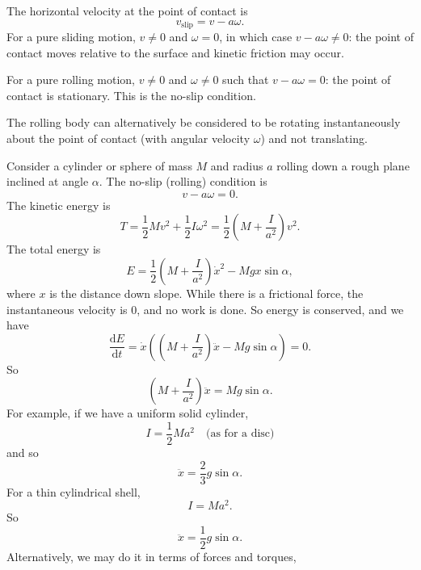 The horizontal velocity at the point of contact is
\[
  v_{\text{slip}} = v - a\omega.
\]
For a pure sliding motion, $v \not = 0$ and $\omega = 0$, in which case $v - a\omega \not = 0$: the point of contact moves relative to the surface and kinetic friction may occur.

For a pure rolling motion, $v\not = 0$ and $\omega \not = 0$ such that $v - a\omega = 0$: the point of contact is stationary. This is the no-slip condition.

The rolling body can alternatively be considered to be rotating instantaneously about the point of contact (with angular velocity $\omega$) and not translating.

\begin{example}\leavevmode
  \begin{center}
  \end{center}
  Consider a cylinder or sphere of mass $M$ and radius $a$ rolling down a rough plane inclined at angle $\alpha$. The no-slip (rolling) condition is
  \[
    v - a\omega = 0 .
  \]
  The kinetic energy is
  \[
    T = \frac{1}{2}Mv^2 + \frac{1}{2}I\omega^2 = \frac{1}{2}\left(M + \frac{I}{a^2}\right)v^2.
  \]
  The total energy is
  \[
    E = \frac{1}{2}\left(M + \frac{I}{a^2}\right) \dot{x}^2 - Mgx\sin \alpha,
  \]
  where $x$ is the distance down slope. While there is a frictional force, the instantaneous velocity is $0$, and no work is done. So energy is conserved, and we have
  \[
    \frac{\mathrm{d} E}{\mathrm{d} t} = \dot{x}\left(\left(M + \frac{I}{a^2}\right)\ddot{x} - Mg\sin \alpha\right) = 0.
  \]
  So
  \[
    \left(M + \frac{I}{a^2}\right)\ddot{x} = Mg\sin \alpha.
  \]
  For example, if we have a uniform solid cylinder,
  \[
    I = \frac{1}{2}Ma^2\quad\text{(as for a disc)}
  \]
  and so
  \[
    \ddot{x} = \frac{2}{3}g\sin \alpha.
  \]
  For a thin cylindrical shell,
  \[
    I = Ma^2.
  \]
  So
  \[
    \ddot{x} = \frac{1}{2}g\sin \alpha.
  \]
  Alternatively, we may do it in terms of forces and torques,

\end{example}
